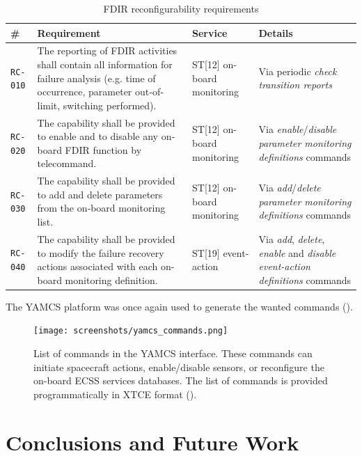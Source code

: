 \documentclass[a4paper,nobib]{tufte-book}
\begin{document}
\begin{table}[h]
	\centering
	\caption{\ac{FDIR} reconfigurability requirements}
	\label{tab:fdir-recon-rq}
	\begin{tabularx}{\textwidth}{@{}lXlL{4cm}@{}}
		\toprule
 		\# & Requirement & Service & Details \\ \midrule
		\texttt{RC-010} & The reporting of FDIR activities shall contain all information for failure analysis (e.g. time of occurrence, parameter out‐of‐limit, switching performed). & ST[12] on-board monitoring & Via periodic \emph{check transition reports} \\
		\texttt{RC-020} & The capability shall be provided to enable and to disable any on‐board FDIR function by telecommand. & ST[12] on-board monitoring & Via \emph{enable}/\emph{disable} \emph{parameter monitoring definitions} commands  \\
		\texttt{RC-030} & The capability shall be provided to add and delete parameters from the on‐board monitoring list. & ST[12] on-board monitoring & Via \emph{add}/\emph{delete} \emph{parameter monitoring definitions} commands  \\
		\texttt{RC-040} & The capability shall be provided to modify the failure recovery actions associated with each on-board monitoring definition. & ST[19] event-action & Via \emph{add}, \emph{delete}, \emph{enable} and \emph{disable} \emph{event-action definitions} commands \\ \bottomrule
	\end{tabularx}
\end{table}

The \ac{YAMCS} platform was once again used to generate the wanted commands ().

\begin{figure}[h]
	\texttt{[image: screenshots/yamcs\_commands.png]}
	\caption{List of commands in the \acs{YAMCS} interface. These commands can initiate spacecraft actions, enable/disable sensors, or reconfigure the on-board \acs{ECSS} services databases. The list of commands is provided programmatically in \ac{XTCE} format ().}
	\label{fig:yamcs_commands}
\end{figure}





\chapter{Conclusions and Future Work}
\end{document}
